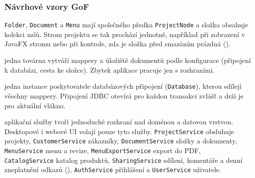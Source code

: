 \subsubsection*{Návrhové vzory GoF}

\begin{description}[itemsep=2pt,style=unboxed]
  \item[Composite] \texttt{Folder}, \texttt{Document} a \texttt{Menu} mají společného předka \texttt{ProjectNode} a složka obsahuje kolekci uzlů. Strom projektu se tak prochází jednotně, například při zobrazení v JavaFX stromu nebo při kontrole, zda je složka před smazáním prázdná ().
  \item[Factory] jedna továrna vytváří mappery a úložiště dokumentů podle konfigurace (připojení k databázi, cesta ke složce). Zbytek aplikace pracuje jen s rozhraními.
  \item[Singleton] jedna instance poskytovatele databázových připojení (\texttt{Database}), kterou sdílejí všechny mappery. Připojení JDBC otevírá pro každou transakci zvlášť a drží je pro aktuální vlákno.
  \item[Facade] aplikační služby tvoří jednoduché rozhraní nad doménou a datovou vrstvou. Desktopové i webové UI volají pouze tyto služby. \texttt{ProjectService} obsluhuje projekty, \texttt{CustomerService} zákazníky, \texttt{DocumentService} složky a dokumenty, \texttt{MenuService} menu a revize, \texttt{MenuExportService} export do PDF, \texttt{CatalogService} katalog produktů, \texttt{SharingService} sdílení, komentáře a denní zneplatnění odkazů (), \texttt{AuthService} přihlášení a \texttt{UserService} uživatele.
\end{description}
